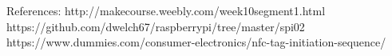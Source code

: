 References:
http://makecourse.weebly.com/week10segment1.html
https://github.com/dwelch67/raspberrypi/tree/master/spi02
https://www.dummies.com/consumer-electronics/nfc-tag-initiation-sequence/

